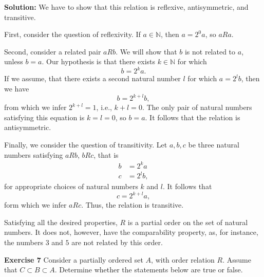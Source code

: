 \documentclass[12pt,oneside]{exam}
\newenvironment{exercise}[1]{\vspace{.1in}\noindent\textbf{Exercise #1 \hspace{.05em}}}{}
\newenvironment{newsolution}{\vspace{.1in}\noindent\textbf{Solution: \hspace{.05em}}}{}
\begin{document}
\begin{newsolution}
We have to show that this relation is reflexive, antisymmetric, and transitive. 

First, consider the question of reflexivity. If $a \in \mathbb{N}$, then $a=2^0a$, so $aRa$. 

Second, consider a related pair $aRb$. We will show that $b$ is not related to $a$, unless $b=a$. Our hypothesis is that there exists $k \in \mathbb{N}$ for which 
\begin{equation*}
b=2^ka.
\end{equation*}
If we assume, that there exists a second natural number $l$ for which $a=2^lb$, then we have 
\begin{equation*}
b=2^{k+l}b,
\end{equation*}
from which we infer $2^{k+l}=1$, i.e., $k+l=0$. The only pair of natural numbers satisfying this equation is $k=l=0$, so $b=a$. It follows that the relation is antisymmetric. 

Finally, we consider the question of transitivity. Let $a,b,c$ be three natural numbers satisfying $aRb$, $bRc$, that is
\begin{align*}
b& =2^ka\\
c & =2^l b,
\end{align*}
for appropriate choices of natural numbers $k$ and $l$. It follows that
\begin{equation*}
c=2^{k+l}a,
\end{equation*}
form which we infer $aRc$. Thus, the relation is transitive. 

Satisfying all the desired properties, $R$ is a partial order on the set of natural numbers. It does not, however, have the comparability property, as, for instance, the numbers $3$ and $5$ are not related by this order. 
\end{newsolution}

\begin{exercise}{7}
Consider a partially ordered set $A$, with order relation $R$. Assume that $C \subset B \subset A$. Determine whether the statements below are true or false.
\end{exercise}
\end{document}

